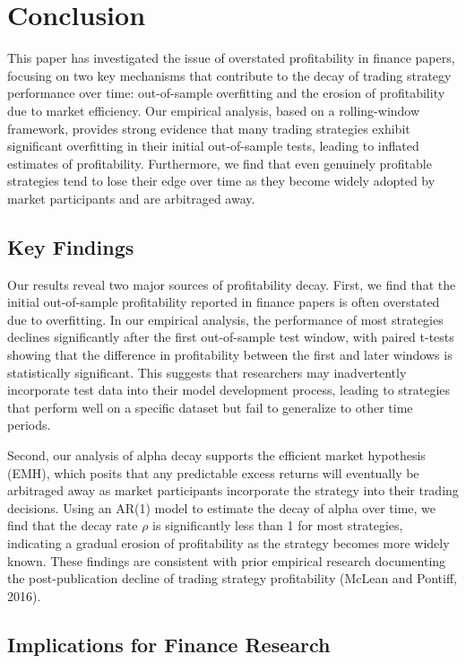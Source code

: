 \section{Conclusion}

This paper has investigated the issue of overstated profitability in finance papers, focusing on two key mechanisms that contribute to the decay of trading strategy performance over time: out-of-sample overfitting and the erosion of profitability due to market efficiency. Our empirical analysis, based on a rolling-window framework, provides strong evidence that many trading strategies exhibit significant overfitting in their initial out-of-sample tests, leading to inflated estimates of profitability. Furthermore, we find that even genuinely profitable strategies tend to lose their edge over time as they become widely adopted by market participants and are arbitraged away.

\subsection{Key Findings}

Our results reveal two major sources of profitability decay. First, we find that the initial out-of-sample profitability reported in finance papers is often overstated due to overfitting. In our empirical analysis, the performance of most strategies declines significantly after the first out-of-sample test window, with paired t-tests showing that the difference in profitability between the first and later windows is statistically significant. This suggests that researchers may inadvertently incorporate test data into their model development process, leading to strategies that perform well on a specific dataset but fail to generalize to other time periods.

Second, our analysis of alpha decay supports the efficient market hypothesis (EMH), which posits that any predictable excess returns will eventually be arbitraged away as market participants incorporate the strategy into their trading decisions. Using an AR(1) model to estimate the decay of alpha over time, we find that the decay rate $\rho$ is significantly less than 1 for most strategies, indicating a gradual erosion of profitability as the strategy becomes more widely known. These findings are consistent with prior empirical research documenting the post-publication decline of trading strategy profitability (McLean and Pontiff, 2016).

\subsection{Implications for Finance Research}

